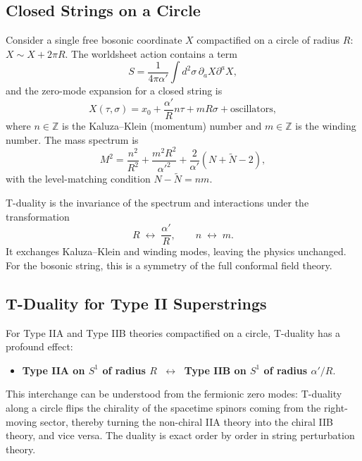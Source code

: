 \documentclass[11pt]{article}
\begin{document}
\subsection{Closed Strings on a Circle}
Consider a single free bosonic coordinate $X$ compactified on a circle of radius $R$: $X \sim X + 2\pi R$. The worldsheet action contains a term
\begin{equation}
    S = \frac{1}{4\pi\alpha'} \int d^2\sigma \, \partial_a X \partial^a X,
\end{equation}
and the zero-mode expansion for a closed string is
\begin{equation}
    X(\tau,\sigma) = x_0 + \frac{\alpha'}{R} n \tau + m R \sigma + \text{oscillators},
\end{equation}
where $n\in\mathbb{Z}$ is the Kaluza--Klein (momentum) number and $m\in\mathbb{Z}$ is the winding number. The mass spectrum is
\begin{equation}
    M^2 = \frac{n^2}{R^2} + \frac{m^2 R^2}{\alpha'^2} + \frac{2}{\alpha'}(N+\tilde{N}-2),
\end{equation}
with the level-matching condition $N-\tilde{N} = nm$.

T-duality is the invariance of the spectrum and interactions under the transformation
\begin{equation}
    R \;\longleftrightarrow\; \frac{\alpha'}{R}, \qquad n \;\longleftrightarrow\; m.
\end{equation}
It exchanges Kaluza--Klein and winding modes, leaving the physics unchanged. For the bosonic string, this is a symmetry of the full conformal field theory.

\subsection{T-Duality for Type II Superstrings}
For Type IIA and Type IIB theories compactified on a circle, T-duality has a profound effect:
\begin{itemize}
    \item \textbf{Type IIA on $S^1$ of radius $R$} $\;\leftrightarrow\;$ \textbf{Type IIB on $S^1$ of radius $\alpha'/R$}.
\end{itemize}
This interchange can be understood from the fermionic zero modes: T-duality along a circle flips the chirality of the spacetime spinors coming from the right-moving sector, thereby turning the non-chiral IIA theory into the chiral IIB theory, and vice versa. The duality is exact order by order in string perturbation theory.
\end{document}
